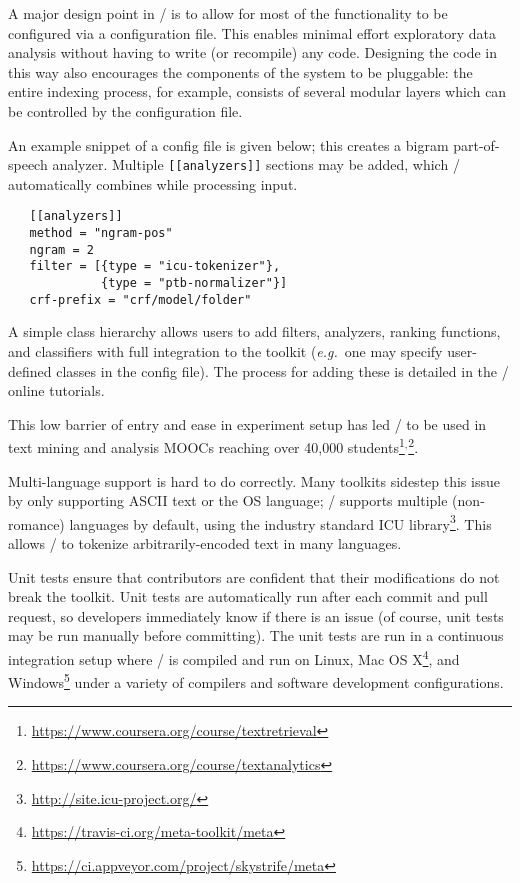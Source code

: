 A major design point in \meta/ is to allow for most of the functionality to be
configured via a configuration file. This enables minimal effort exploratory
data analysis without having to write (or recompile) any code. Designing the
code in this way also encourages the components of the system to be pluggable:
the entire indexing process, for example, consists of several modular layers
which can be controlled by the configuration file.

An example snippet of a config file is given below; this creates a bigram
part-of-speech analyzer. Multiple \texttt{[[analyzers]]} sections may be added,
which \meta/ automatically combines while processing input.

{\small
\begin{verbatim}
   [[analyzers]]
   method = "ngram-pos"
   ngram = 2
   filter = [{type = "icu-tokenizer"},
             {type = "ptb-normalizer"}]
   crf-prefix = "crf/model/folder"
\end{verbatim}}

A simple class hierarchy allows users to add filters, analyzers, ranking
functions, and classifiers with full integration to the toolkit
(\emph{e.g.}\ one
may specify user-defined classes in the config file). The process for adding
these is detailed in the \meta/ online tutorials.

This low barrier of entry and ease in experiment setup has led \meta/ to be used
in text mining and analysis MOOCs reaching over 40,000
students\footnote{\url{https://www.coursera.org/course/textretrieval}}$^,$\footnote{\url{https://www.coursera.org/course/textanalytics}}.

Multi-language support is hard to do correctly. Many toolkits sidestep this
issue by only supporting ASCII text or the OS language; \meta/ supports multiple
(non-romance) languages by default, using the industry standard ICU
library\footnote{\url{http://site.icu-project.org/}}. This allows \meta/ to
tokenize arbitrarily-encoded text in many languages.

Unit tests ensure that contributors are confident that their modifications do
not break the toolkit. Unit tests are automatically run after each commit and
pull request, so developers immediately know if there is an issue (of course,
unit tests may be run manually before committing). The unit tests are run in a
continuous integration setup where \meta/ is compiled and run on Linux, Mac OS
X\footnote{\url{https://travis-ci.org/meta-toolkit/meta}}, and
Windows\footnote{\url{https://ci.appveyor.com/project/skystrife/meta}} under a
variety of compilers and software development configurations.
